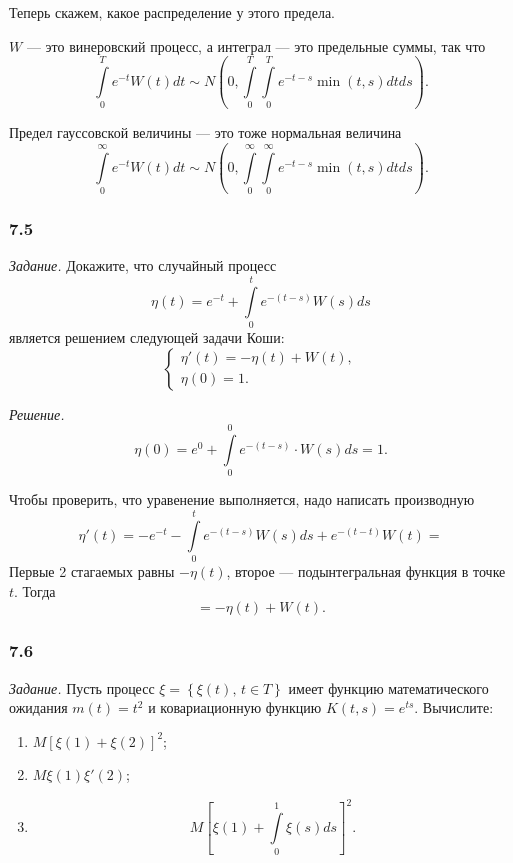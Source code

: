 Теперь скажем, какое распределение у этого предела.

$W$ --- это винеровский процесс, а интеграл --- это предельные суммы, так что
$$ \int \limits_0^T e^{-t} W \left( t \right) dt \sim
  N \left( 0, \int \limits_0^T \int \limits_0^T e^{-t-s} \min \left( t, s \right) dtds \right).$$

Предел гауссовской величины --- это тоже нормальная величина
$$ \int \limits_0^{ \infty } e^{-t} W \left( t \right) dt \sim
  N \left(
    0, \int \limits_0^{ \infty } \int \limits_0^{ \infty } e^{-t-s} \min \left( t, s \right) dtds
  \right).$$

\subsubsection*{7.5}

\textit{Задание.}
Докажите, что случайный процесс
$$ \eta \left( t \right) =
  e^{-t} + \int \limits_0^t e^{-\left( t - s \right) } W \left( s \right) ds$$
является решением следующей задачи Коши:
$$ \begin{cases}
    \eta' \left( t \right) = -\eta \left( t \right) + W \left( t \right), \\
    \eta \left( 0 \right) = 1.
  \end{cases}$$

\textit{Решение.}
$$ \eta \left( 0 \right) =
  e^0 + \int \limits_0^0 e^{-\left( t - s \right) } \cdot W \left( s \right) ds = 1.$$

Чтобы проверить, что уравенение выполняется, надо написать производную
$$ \eta' \left( t \right) =
  -e^{-t} - \int \limits_0^t e^{-\left( t - s \right) } W \left( s \right) ds +
  e^{-\left( t - t \right) } W \left( t \right) =$$
Первые 2 стагаемых равны $-\eta \left( t \right) $, второе --- подынтегральная функция в точке $t$.
Тогда
$$= -\eta \left( t \right) + W \left( t \right).$$

\subsubsection*{7.6}

\textit{Задание.}
Пусть процесс $ \xi = \left\{ \xi \left( t \right), \, t \in T \right\} $
имеет функцию математического ожидания $m \left( t \right) = t^2$ и ковариационную функцию
$K \left( t, s \right) = e^{ts}$.
Вычислите:
\begin{enumerate}[label=\alph*)]
  \item $M \left[ \xi \left( 1 \right) + \xi \left( 2 \right) \right]^2$;
  \item $M \xi \left( 1 \right) \xi' \left( 2 \right) $;
  \item $$M \left[ \xi \left( 1 \right) + \int \limits_0^1 \xi \left( s \right) ds \right]^2.$$
\end{enumerate}


